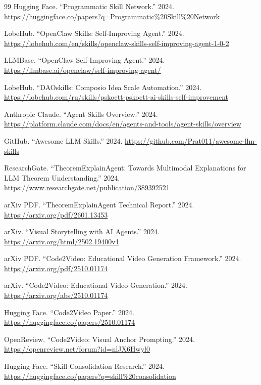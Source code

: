 \documentclass[11pt,a4paper]{article}
\begin{document}
\begin{thebibliography}{99}
Hugging Face. ``Programmatic Skill Network.'' 2024. \url{https://huggingface.co/papers?q=Programmatic%20Skill%20Network}

LobeHub. ``OpenClaw Skills: Self-Improving Agent.'' 2024. \url{https://lobehub.com/en/skills/openclaw-skills-self-improving-agent-1-0-2}

LLMBase. ``OpenClaw Self-Improving Agent.'' 2024. \url{https://llmbase.ai/openclaw/self-improving-agent/}

LobeHub. ``DAOskills: Composio Idea Scale Automation.'' 2024. \url{https://lobehub.com/ru/skills/pskoett-pskoett-ai-skills-self-improvement}


Anthropic Claude. ``Agent Skills Overview.'' 2024. \url{https://platform.claude.com/docs/en/agents-and-tools/agent-skills/overview}

GitHub. ``Awesome LLM Skills.'' 2024. \url{https://github.com/Prat011/awesome-llm-skills}

ResearchGate. ``TheoremExplainAgent: Towards Multimodal Explanations for LLM Theorem Understanding.'' 2024. \url{https://www.researchgate.net/publication/389392521}

arXiv PDF. ``TheoremExplainAgent Technical Report.'' 2024. \url{https://arxiv.org/pdf/2601.13453}

arXiv. ``Visual Storytelling with AI Agents.'' 2024. \url{https://arxiv.org/html/2502.19400v1}

arXiv PDF. ``Code2Video: Educational Video Generation Framework.'' 2024. \url{https://arxiv.org/pdf/2510.01174}

arXiv. ``Code2Video: Educational Video Generation.'' 2024. \url{https://arxiv.org/abs/2510.01174}

Hugging Face. ``Code2Video Paper.'' 2024. \url{https://huggingface.co/papers/2510.01174}

OpenReview. ``Code2Video: Visual Anchor Prompting.'' 2024. \url{https://openreview.net/forum?id=nlJX6Hwyl0}

Hugging Face. ``Skill Consolidation Research.'' 2024. \url{https://huggingface.co/papers?q=skill%20consolidation}


\end{thebibliography}
\end{document}

